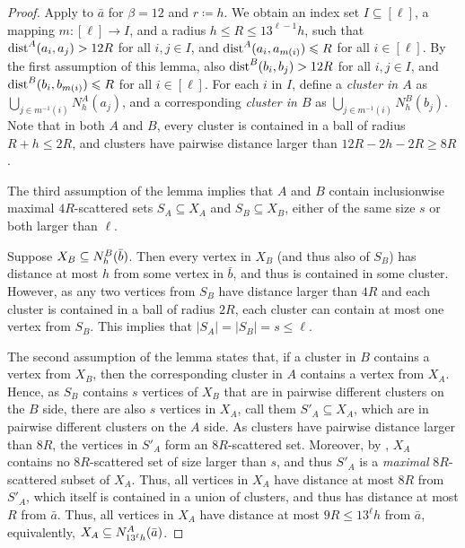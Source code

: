 \begin{proof}
    Apply  to \(\bar a\) for $\beta=12$ and $r\coloneqq h$.
        We obtain an index set \(I \subseteq [\ell]\), a mapping \(m : [\ell] \to I\), and a radius \(h \le R \le 13^{\ell-1} h\), such that
        \(\mathrm{dist}^A(a_i,a_j) > 12 R\) for all \(i,j \in I\), and
        \(\mathrm{dist}^A(a_i,a_{m(i)}) \leqslant R\) for all \(i \in [\ell]\).
        By the first assumption of this lemma, also
        \(\mathrm{dist}^B(b_i,b_j) > 12 R\) for all \(i,j \in I\), and
        \(\mathrm{dist}^B(b_i,b_{m(i)}) \leqslant R\) for all \(i \in [\ell]\).
        For each \(i\) in \(I\), define 
        a \emph{cluster in \(A\)} as \(\bigcup_{j \in m^{-1}(i)} N^A_h(a_j) \),
        and a corresponding \emph{cluster in \(B\)} as \(\bigcup_{j \in m^{-1}(i)} N^B_h(b_j) \).
        Note that in both \(A\) and \(B\), every cluster is contained in a ball of radius \(R+h \le 2R\), 
        and clusters have pairwise distance larger than \(12R-2h-2R \ge 8R\).

        The third assumption of the lemma implies that
        \(A\) and \(B\) contain inclusionwise maximal \(4R\)-scattered sets \(S_A \subseteq X_A\)
        and \(S_B \subseteq X_B\), either of the same size \(s\) or both larger than \(\ell\).
        
        Suppose  $X_B\subseteq N_h^B(\bar b)$. Then every vertex in \(X_B\) (and thus also of \(S_B\))
        has distance at most \(h\) from some vertex in \(\bar b\),
        and thus is contained in some cluster.
        However, as any two vertices from \(S_B\) have distance larger than \(4R\)
        and each cluster is contained in a ball of radius \(2R\),
        each cluster can contain at most one vertex from \(S_B\).
        This implies that \(|S_A|=|S_B|=s \le \ell\).

        The second assumption of the lemma states that, if a cluster in \(B\) contains a vertex from \(X_B\),
        then the corresponding cluster in \(A\) contains a vertex from \(X_A\).
        Hence, as \(S_B\) contains \(s\) vertices of \(X_B\) that are in pairwise different clusters on the \(B\) side,
        there are also \(s\) vertices in \(X_A\), call them \(S'_A \subseteq X_A\), which are in pairwise different clusters on the \(A\) side.
        As clusters have pairwise distance larger than \(8R\), the vertices in \(S'_A\) form an \(8R\)-scattered set.
        Moreover, by , \(X_A\) contains no \(8R\)-scattered set of size larger than \(s\),
        and thus \(S'_A\) is a \emph{maximal} \(8R\)-scattered subset of \(X_A\).
        Thus, all vertices in \(X_A\) have distance at most \(8R\) from \(S'_A\), which itself is contained in a union of clusters, 
        and thus has distance at most \(R\) from \(\bar a\).
        Thus, all vertices in \(X_A\) have distance at most \(9R \le 13^\ell h\) from \(\bar a\), equivalently, $X_A\subseteq N^A_{13^\ell h}(\bar a)$.
\end{proof}

